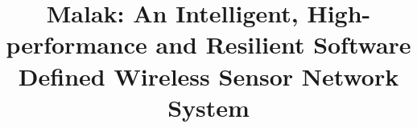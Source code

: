 \documentclass{sig-alternate}
\newcommand{\sdn}{Malak}
\begin{document}
\title{{\sdn}: An Intelligent, High-performance and Resilient Software Defined Wireless Sensor Network System}
\author{}



\maketitle

  



%






\end{document}
